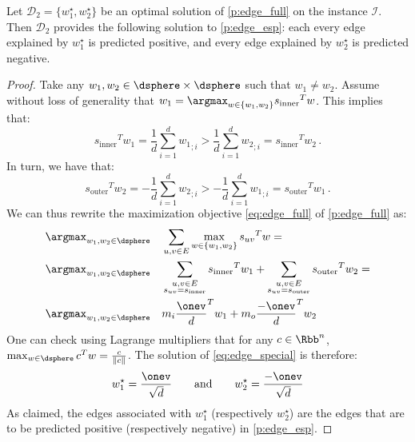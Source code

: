 \begin{prop}
  Let $\mathcal{D}_2 = \{w_1^\star, w_2^\star\}$ be an optimal solution of \autoref{p:edge_full} on the
  instance $\mathcal{I}$. Then $\mathcal{D}_2$ provides the following solution to
  \autoref{p:edge_esp}: each every edge explained by $w_1^\star$ is predicted positive, and every
  edge explained by $w_2^\star$ is predicted negative.
\end{prop}
\begin{proof}
  Take any $w_1, w_2 \in \dsphere \times \dsphere$ such that $w_1 \neq w_2$. Assume without loss of
  generality that $w_1 = \argmax_{w\in \{w_1, w_2\}} {s_{\mathrm{inner}}}^T w$. This implies that:
  \begin{equation*}
    {s_{\mathrm{inner}}}^T w_1 = \frac{1}{d}\sum_{i=1}^d {w_1}_{;i} >
    \frac{1}{d}\sum_{i=1}^d {w_2}_{;i} = {s_{\mathrm{inner}}}^T w_2 \,.
  \end{equation*}
  In turn, we have that:
  \begin{equation*}
    {s_{\mathrm{outer}}}^T w_2 = -\frac{1}{d}\sum_{i=1}^d {w_2}_{;i} >
    -\frac{1}{d}\sum_{i=1}^d {w_1}_{;i} = {s_{\mathrm{outer}}}^T w_1 \,.
  \end{equation*}
  We can thus rewrite the maximization objective \eqref{eq:edge_full} of \autoref{p:edge_full} as:
  \begin{align}
    \label{eq:edge_special}
    \argmax_{w_1,w_2 \in \dsphere} & \quad \sum_{u,v \in E} \max_{w \in \{w_1, w_2\}} {s_{uv}}^T w = \\
    \argmax_{w_1,w_2 \in \dsphere} & \quad
    \sum_{\substack{u,v \in E\\ s_{uv} = s_{\mathrm{inner}}}} {s_{\mathrm{inner}}}^T w_1 +
    \sum_{\substack{u,v \in E\\ s_{uv} = s_{\mathrm{outer}}}} {s_{\mathrm{outer}}}^T w_2 = \notag \\
    \argmax_{w_1,w_2 \in \dsphere} & \quad m_i {\frac{\onev}{d}}^T w_1  + m_o {\frac{-\onev}{d}} ^T w_2 \notag
  \end{align}
  One can check using Lagrange multipliers that for any $c \in \Rbb^n$, $\max_{w \in \dsphere} c^T w
  = \frac{c}{\|c\|}$. The solution of \eqref{eq:edge_special} is therefore:
  \begin{equation*}
    w_1^\star = \frac{\onev}{\sqrt{d}} \qquad \text{and} \qquad w_2^\star = \frac{-\onev}{\sqrt{d}}
  \end{equation*}
  As claimed, the edges associated with $w_1^\star$ (respectively $w_2^\star$) are the edges that
  are to be predicted positive (respectively negative) in \autoref{p:edge_esp}.
\end{proof}


